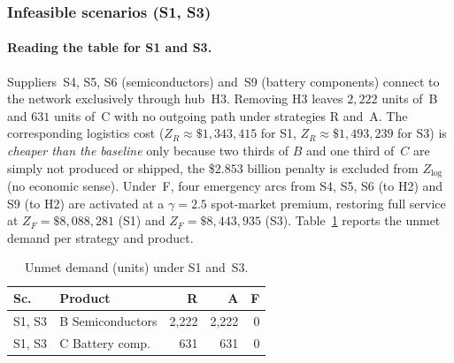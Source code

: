 \subsubsection*{Infeasible scenarios (S1, S3)}

\paragraph{Reading the table for S1 and S3.}
Suppliers~S4, S5, S6 (semiconductors) and~S9 (battery components)
connect to the network exclusively through hub~H3. Removing H3 leaves
$2{,}222$ units of~B and $631$ units of~C with no outgoing path
under strategies R and~A. The corresponding logistics cost
($Z_R \approx \$1{,}343{,}415$ for S1, $Z_R \approx \$1{,}493{,}239$
for S3) is \emph{cheaper than the baseline} only because two thirds
of $B$ and one third of~$C$ are simply not produced or shipped, the
\$$2.853$ billion penalty is excluded from $Z_{\text{log}}$ (no economic sense).
Under~F, four emergency arcs from S4, S5, S6 (to H2) and S9 (to H2)
are activated at a $\gamma = 2.5$ spot-market premium, restoring full
service at $Z_F = \$8{,}088{,}281$ (S1) and $Z_F = \$8{,}443{,}935$
(S3). Table~\ref{tab:s1s3_unmet} reports the unmet demand per
strategy and product.

\begin{table}[H]
\centering
\caption{Unmet demand (units) under S1 and~S3.}
\label{tab:s1s3_unmet}
\small
\begin{tabular}{llrrr}
\toprule
\textbf{Sc.} & \textbf{Product} & \textbf{R} & \textbf{A} & \textbf{F} \\
\midrule
S1, S3 & B Semiconductors      & 2{,}222 & 2{,}222 & 0 \\
S1, S3 & C Battery comp.        &   631 &   631 & 0 \\
\bottomrule
\end{tabular}
\end{table}

